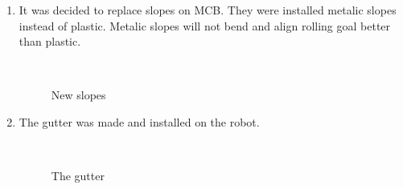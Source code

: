 \begin{enumerate}
\begin{enumerate}
		\item It was decided to replace slopes on MCB. They were installed metalic slopes instead of plastic. Metalic slopes will not bend and align rolling goal better than plastic.
		\begin{figure}[H]
			\begin{minipage}[h]{0.2\linewidth}
				\center  
			\end{minipage}
			\begin{minipage}[h]{0.6\linewidth}
				\caption{New slopes}
			\end{minipage}
		\end{figure}
		
		\item The gutter was made and installed on the robot.
		\begin{figure}[H]
			\begin{minipage}[h]{0.2\linewidth}
				\center  
			\end{minipage}
			\begin{minipage}[h]{0.6\linewidth}
				\caption{The gutter}
			\end{minipage}
		\end{figure}
		

\end{enumerate}
\end{enumerate}
